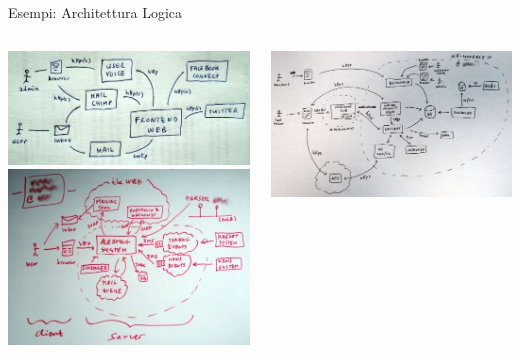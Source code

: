 	\begin{frame}{Esempi: Architettura Logica}
		\begin{columns}[T]
		    \begin{column}{.5\textwidth}
				\includegraphics[scale=0.13]{images/architecture-2}
				\\ \vspace*{0.2cm}
				\includegraphics[scale=0.135]{images/architecture-3}
		    \end{column}
		    \begin{column}{.5\textwidth}
				\includegraphics[scale=0.13]{images/architecture-5}

\end{column}
\end{columns}
\end{frame}
